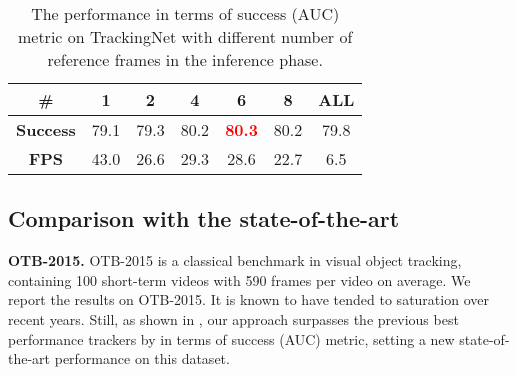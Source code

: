 \documentclass[final]{cvpr}
\begin{document}
\begin{table}[!tbp]
 \centering
 \caption{\label{tab:ablation_study_num_frames_for_testing}The performance in terms of success (AUC) metric on TrackingNet with different number of reference frames in the inference phase.}
 \vspace{-1.0em}
 \begin{tabular}{c|cccccc}
  \toprule
  \textbf{\#} & \textbf{1} & \textbf{2} & \textbf{4} & \textbf{6} & \textbf{8} & \textbf{ALL}  \\
  \midrule
  \textbf{Success} & 79.1 & 79.3 & 80.2 & \textcolor{red}{\textbf{80.3}} & 80.2 & 79.8 \\
  \textbf{FPS} & 43.0 & 26.6 & 29.3 & 28.6 & 22.7 & 6.5 \\
  \bottomrule
 \end{tabular}
 \vspace{-1.0em}
\end{table}

\subsection{Comparison with the state-of-the-art}
\textbf{OTB-2015.}
OTB-2015 \cite{otb2015} is a classical benchmark in visual object tracking, containing 100 short-term videos with 590 frames per video on average.
We report the results on OTB-2015.
It is known to have tended to saturation over recent years.
Still, as shown in , our approach surpasses the previous best performance trackers by  in terms of success (AUC) metric, setting a new state-of-the-art performance on this dataset.
\end{document}
